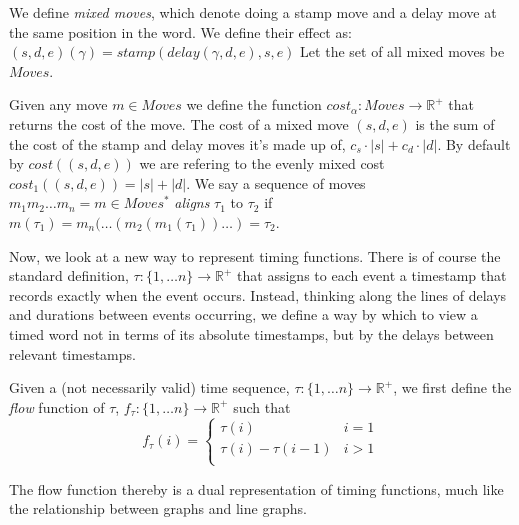 \documentclass[runningheads]{llncs}
\newcounter{cases}
\begin{document}
    \begin{definition}
        We define \textit{mixed moves}, which denote doing a stamp move and a delay move at the same position in the word. 
        We define their effect as: $(s, d, e)(\gamma) = stamp(delay(\gamma, d, e), s, e)$
        Let the set of all mixed moves be $Moves$. 
    \end{definition}
    
    Given any move $m \in Moves$ we define the function $cost_{\alpha}: Moves \to \mathbb{R}^+$ that returns the cost of the move.  
    The cost of a mixed move $(s, d, e)$ is the sum of the cost of the stamp and delay moves it's made up of, $c_s\cdot|s| + c_d \cdot|d|$.
    By default by $cost((s, d, e))$ we are refering to the evenly mixed cost $cost_1((s, d, e)) = |s| + |d|$. 
We say a sequence of moves $m_1m_2\dots m_n = m \in Moves^*$ \textit{aligns} $\tau_1$ to $\tau_2$ if $m(\tau_1) = m_n(\dots (m_2(m_1(\tau_1))\dots) = \tau_2$. 
    
 Now, we look at a new way to represent timing functions. 
    There is of course the standard definition, $\tau: \{1, \dots n\} \to \mathbb{R}^+$ that assigns to each event a timestamp that records exactly when the event occurs. 
    Instead, thinking along the lines of delays and durations between events occurring, we define a way by which to view a timed word not in terms of its absolute timestamps, but by the delays between relevant timestamps. 
    
    \begin{definition}
        Given a (not necessarily valid) time sequence,  $\tau: \{1, \dots n\} \to \mathbb{R}^+$, we first define the \textit{flow} function of $\tau$, $f_{\tau}: \{1, \dots n\} \to \mathbb{R}^+$ such that 
        $$f_{\tau}(i) = \begin{cases} 
            \tau(i) & i = 1\\
            \tau(i) - \tau(i-1) &i > 1\\
        \end{cases}
        $$
        
    \end{definition}
    
    The flow function thereby is a dual representation of timing functions, much like the relationship between graphs and line graphs. %
    
\end{document}
